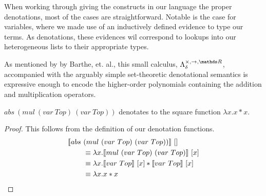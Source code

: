 \documentclass[11pt, final]{article}
\begin{document}
  When working through giving the constructs in our language the proper denotations, most of the cases are straightforward.
  Notable is the case for variables, where we made use of an inductively defined evidence to type our terms.
  As denotations, these evidences wil correspond to lookups into our heterogeneous lists to their appropriate types.



  As mentioned by by Barthe, et. al.\cite{barthe2020versatility}, this small calculus, $\lambdaBase$, accompanied with the arguably simple set-theoretic denotational semantics is expressive enough to encode the higher-order polynomials containing the addition and multiplication operators.

  \begin{example}[Square]
    $abs\ (mul\ (var\ Top)\ (var\ Top))$ denotates to the square function $\lambda x. x * x$.
    \begin{proof}
      This follows from the definition of our denotation functions.
      \begin{align*}
        \llbracket abs\ &(mul\ (var\ Top)\ (var\ Top)) \rrbracket\ [] \\
          &\equiv \lambda x.
            \llbracket mul\ (var\ Top)\ (var\ Top) \rrbracket\ [x] \\
          &\equiv \lambda x.
            \llbracket var\ Top \rrbracket\ [x] *
              \llbracket var\ Top \rrbracket\ [x] \\
          &\equiv \lambda x. x * x \qedhere
      \end{align*}
    \end{proof}
  \end{example}
\end{document}
